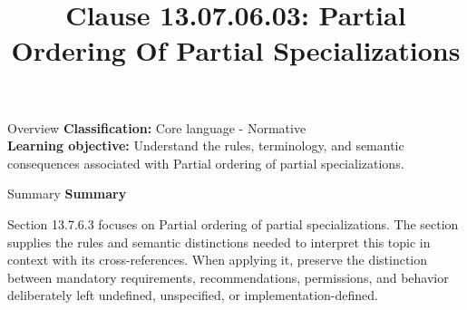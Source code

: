 \documentclass[10pt,letterpaper]{article}
\title{Clause 13.07.06.03: Partial Ordering Of Partial Specializations}
\author{}
\date{}
\begin{document}
\maketitle
\begin{CornellOverviewBox}{Overview}
\textbf{Classification:} Core language - Normative\\[2pt]
\textbf{Learning objective:} Understand the rules, terminology, and semantic consequences associated with Partial ordering of partial specializations.
\end{CornellOverviewBox}\begin{CornellSummaryBox}{Summary}
{\sffamily\bfseries\color{Accent} Summary}\par\vspace{3pt}Section 13.7.6.3 focuses on Partial ordering of partial specializations. The section supplies the rules and semantic distinctions needed to interpret this topic in context with its cross-references. When applying it, preserve the distinction between mandatory requirements, recommendations, permissions, and behavior deliberately left undefined, unspecified, or implementation-defined.
\end{CornellSummaryBox}
\end{document}
